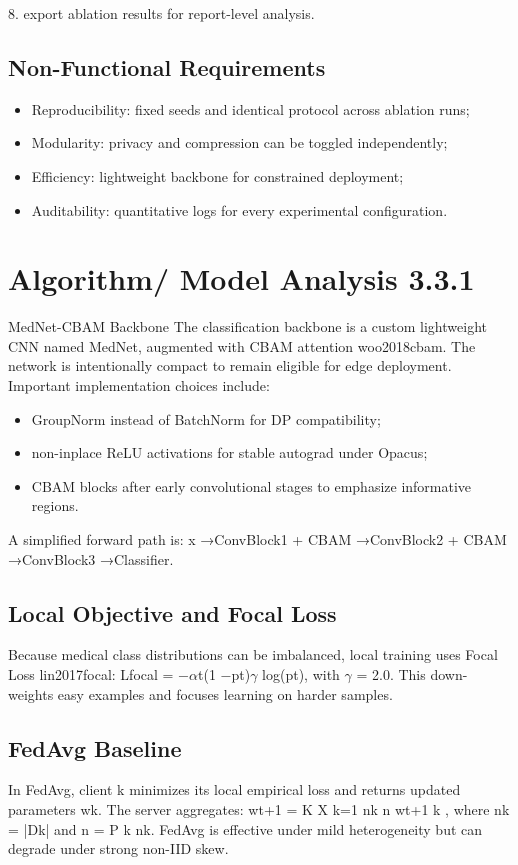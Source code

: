 \documentclass[12pt,a4paper]{report}
\begin{document}
8. export ablation results for report-level analysis.
\subsection{Non-Functional Requirements}
\begin{itemize}
\item Reproducibility: fixed seeds and identical protocol across ablation runs;
\item Modularity: privacy and compression can be toggled independently;
\item Efficiency: lightweight backbone for constrained deployment;
\item Auditability: quantitative logs for every experimental configuration.
\end{itemize}
\section{Algorithm/ Model Analysis 3.3.1}
MedNet-CBAM Backbone
The classification backbone is a custom lightweight CNN named MedNet, augmented with CBAM attention woo2018cbam. The network is intentionally compact to remain eligible for edge deployment. Important implementation choices include:
\begin{itemize}
\item GroupNorm instead of BatchNorm for DP compatibility;
\item non-inplace ReLU activations for stable autograd under Opacus;
\item CBAM blocks after early convolutional stages to emphasize informative regions.
\end{itemize}
A simplified forward path is:
x →ConvBlock1 + CBAM →ConvBlock2 + CBAM →ConvBlock3 →Classifier.

\subsection{Local Objective and Focal Loss}
Because medical class distributions can be imbalanced, local training uses Focal Loss lin2017focal:
Lfocal = $-$$\alpha$t(1 $-$pt)$\gamma$ log(pt), with $\gamma$ = 2.0. This down-weights easy examples and focuses learning on harder samples.
\subsection{FedAvg Baseline}
In FedAvg, client k minimizes its local empirical loss and returns updated parameters wk. The server aggregates:
wt+1 =
K
X k=1 nk n wt+1 k
, where nk = |Dk| and n = P k nk. FedAvg is effective under mild heterogeneity but can degrade under strong non-IID skew.
\end{document}

